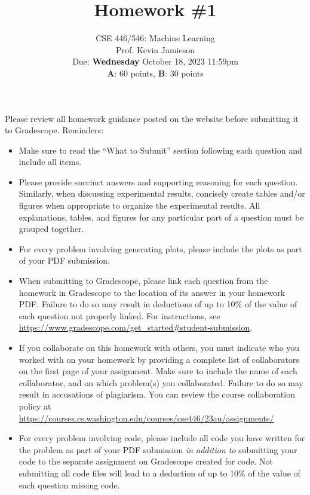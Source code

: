 \documentclass{article}
\begin{document}
\setcounter{aprob}{0}
\title{Homework \#1}
\author{
    \normalsize{CSE 446/546: Machine Learning}\\
    \normalsize{Prof. Kevin Jamieson}\\
    \normalsize{Due: \textbf{Wednesday} October 18, 2023 11:59pm}\\
    \normalsize{\textbf{A}: 60 points, \textbf{B}: 30 points}
}
\date{{}}
\maketitle

\noindent Please review all homework guidance posted on the website before submitting it to Gradescope. Reminders:
\begin{itemize}
    \item Make sure to read the ``What to Submit'' section following each question and include all items.
    \item Please provide succinct answers and supporting reasoning for each question. Similarly, when discussing experimental results, concisely create tables and/or figures when appropriate to organize the experimental results. All explanations, tables, and figures for any particular part of a question must be grouped together.
    \item For every problem involving generating plots, please include the plots as part of your PDF submission.
    \item When submitting to Gradescope, please link each question from the homework in Gradescope to the location of its answer in your homework PDF. Failure to do so may result in deductions of up to 10\% of the value of each question not properly linked. For instructions, see \url{https://www.gradescope.com/get_started#student-submission}.
    \item If you collaborate on this homework with others, you must indicate who you worked with on your homework by providing a complete list of collaborators on the first page of your assignment. Make sure to include the name of each collaborator, and on which problem(s) you collaborated. Failure to do so may result in accusations of plagiarism. You can review the course collaboration policy at \url{https://courses.cs.washington.edu/courses/cse446/23au/assignments/}
    \item For every problem involving code, please include all code you have written for the problem as part of your PDF submission \emph{in addition to} submitting your code to the separate assignment on Gradescope created for code. Not submitting all code files will lead to a deduction of up to 10\% of the value of each question missing code.
\end{itemize}
\end{document}
